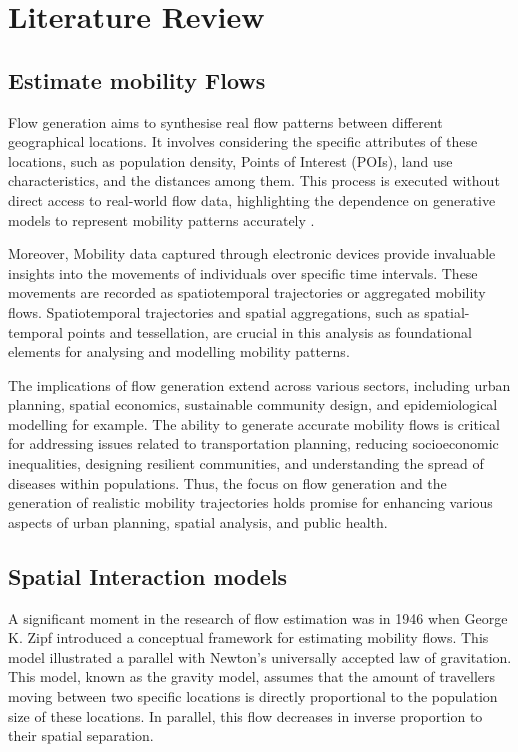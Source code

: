 \chapter{Literature Review}
\label{chapterlabel2}
    \section{Estimate mobility Flows} 

     Flow generation aims to synthesise real flow patterns between different geographical locations. It involves considering the specific attributes of these locations, such as population density, Points of Interest (POIs), land use characteristics, and the distances among them. This process is executed without direct access to real-world flow data, highlighting the dependence on generative models to represent mobility patterns accurately \citep{lucaSurveyDeepLearning2021}.
    
    Moreover, Mobility data captured through electronic devices provide invaluable insights into the movements of individuals over specific time intervals\citep{lucaSurveyDeepLearning2021}. These movements are recorded as spatiotemporal trajectories or aggregated mobility flows. Spatiotemporal trajectories and spatial aggregations, such as spatial-temporal points and tessellation, are crucial in this analysis as foundational elements for analysing and modelling mobility patterns\citep{lucaSurveyDeepLearning2021, siminiDeepGravityModel2021}.
    
    The implications of flow generation extend across various sectors, including urban planning, spatial economics, sustainable community design, and epidemiological modelling for example. The ability to generate accurate mobility flows is critical for addressing issues related to transportation planning, reducing socioeconomic inequalities, designing resilient communities, and understanding the spread of diseases within populations\citep{lucaSurveyDeepLearning2021}. Thus, the focus on flow generation and the generation of realistic mobility trajectories holds promise for enhancing various aspects of urban planning, spatial analysis, and public health.
      
    \section{Spatial Interaction models}

    A significant moment in the research of flow estimation was in 1946 when George K. Zipf introduced a conceptual framework for estimating mobility flows\citep{siminiDeepGravityModel2021, wilkinsonSpatialInteractionModels2023}. This model illustrated a parallel with Newton's universally accepted law of gravitation. This model, known as the gravity model, assumes that the amount of travellers moving between two specific locations is directly proportional to the population size of these locations. In parallel, this flow decreases in inverse proportion to their spatial separation\citep{wilsonFamilySpatialInteraction1971b}.
        
